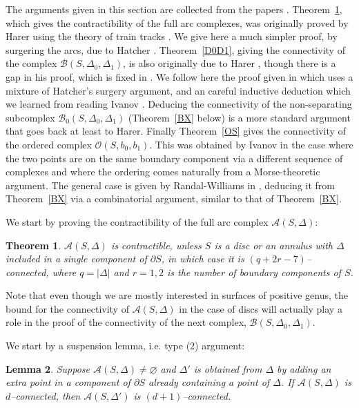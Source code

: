\documentclass[10pt]{amsart}
\newtheorem{thm}{Theorem}[section]
\newtheorem{lem}[thm]{Lemma}
\newcommand{\A}{\mathcal{A}}
\newcommand{\BB}{\mathcal{B}}
\newcommand{\OO}{\mathcal{O}}
\newcommand{\De}{\Delta}
\newcommand{\del}{\partial}
\newcommand{\emp}{\varnothing}
\begin{document}
\smallskip

The arguments given in this section are collected from the papers \cite{Har85,Hat91,Iva89,RW09,Wahl08}. 
Theorem~\ref{A}, which gives the contractibility of the full arc complexes, was originally proved by Harer using the
theory of train tracks \cite[Sect.~2]{Har85}. We give here a much simpler proof, by surgering the arcs, 
due to Hatcher \cite{Hat91}. Theorem~\ref{D0D1}, giving the connectivity of the complex $\BB(S,\De_0,\De_1)$,
is also originally due to Harer \cite[Thm.~1.6]{Har85}, though there
is a gap in his proof, which is fixed in \cite[Thm.~2.3]{Wahl08}. We follow here the proof given in \cite{Wahl08} which uses a
mixture of Hatcher's surgery argument, and an careful inductive deduction which we learned from reading
Ivanov \cite{Iva89}. Deducing the connectivity of the non-separating subcomplex $\BB_0(S,\De_0,\De_1)$ (Theorem~\ref{BX}
below) is a more standard argument that goes back at least to Harer. Finally Theorem~\ref{OS} 
gives the
connectivity of the ordered complex $\OO(S,b_0,b_1)$. This was obtained by Ivanov \cite[Thm.~2.10]{Iva89} 
in the case where the two points are
on the same boundary component via a different sequence of complexes and where the ordering comes naturally from a
Morse-theoretic argument. The general case is given by Randal-Williams in \cite[Thm.~A.1]{RW09}, deducing it from Theorem~\ref{BX} 
via a combinatorial argument, similar to that of Theorem~\ref{BX}. 

\smallskip

We start by proving the contractibility of the full arc complex $\A(S,\De)$: 





\begin{thm}\label{A}
$\A(S,\Delta)$ is contractible, unless $S$ is a disc or an annulus with $\Delta$ included in a single component of $\del S$, in which
case it is $(q+2r-7)$--connected, where $q=|\Delta|$ and $r=1,2$ is the number of boundary components of $S$.  
\end{thm}  


Note that even though we are mostly interested in surfaces of positive genus,
the bound for the connectivity of $\A(S,\De)$ in the case of discs will actually play a role in the proof of the
connectivity of the next complex, $\BB(S,\De_0,\De_1)$. 

We start by a suspension lemma, i.e. type (2) argument: 

\begin{lem}\label{lemA}
Suppose $\A(S,\Delta)\neq \emp$ and $\Delta'$ is obtained from $\Delta$ by adding an extra point in a component of $\del S$ already
containing a point of $\Delta$. 
If $\A(S,\Delta)$ is $d$--connected, then  $\A(S,\Delta')$ is $(d+1)$--connected. 
\end{lem}
\end{document}
